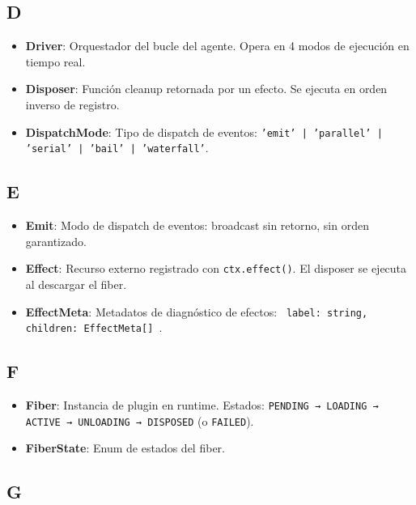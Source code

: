 \documentclass[11pt,a4paper]{article}
\begin{document}
\subsection*{D}


\begin{itemize}[leftmargin=*,topsep=2pt,itemsep=1pt]
  \item \textbf{Driver}: Orquestador del bucle del agente. Opera en 4 modos de ejecución en tiempo real.
  \item \textbf{Disposer}: Función cleanup retornada por un efecto. Se ejecuta en orden inverso de registro.
  \item \textbf{DispatchMode}: Tipo de dispatch de eventos: \texttt{'emit' | 'parallel' | 'serial' | 'bail' | 'waterfall'}.
\end{itemize}


\subsection*{E}


\begin{itemize}[leftmargin=*,topsep=2pt,itemsep=1pt]
  \item \textbf{Emit}: Modo de dispatch de eventos: broadcast sin retorno, sin orden garantizado.
  \item \textbf{Effect}: Recurso externo registrado con \texttt{ctx.effect()}. El disposer se ejecuta al descargar el fiber.
  \item \textbf{EffectMeta}: Metadatos de diagnóstico de efectos: \texttt{{ label: string, children: EffectMeta[] }}.
\end{itemize}


\subsection*{F}


\begin{itemize}[leftmargin=*,topsep=2pt,itemsep=1pt]
  \item \textbf{Fiber}: Instancia de plugin en runtime. Estados: \texttt{PENDING → LOADING → ACTIVE → UNLOADING → DISPOSED} (o \texttt{FAILED}).
  \item \textbf{FiberState}: Enum de estados del fiber.
\end{itemize}


\subsection*{G}
\end{document}
